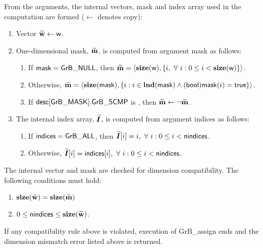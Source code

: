 From the arguments, the internal vectors, mask and index array used in 
the computation are formed ($\leftarrow$ denotes copy):
\begin{enumerate}
	\item Vector ${\bf \widetilde{w}} \leftarrow {\sf w}$.

	\item One-dimensional mask, ${\bf \widetilde{m}}$, is computed from 
    argument {\sf mask} as follows:
	\begin{enumerate}
		\item	If ${\sf mask} = {\sf GrB\_NULL}$, then ${\bf \widetilde{m}} = 
        \langle \bold{size}({\sf w}), \{i, \ \forall \ i : 0 \leq i < 
        \bold{size}({\sf w}) \} \rangle$.

		\item	Otherwise, ${\bf \widetilde{m}} = 
        \langle \bold{size}({\sf mask}), \{i : i \in \bold{ind}({\sf mask}) \wedge
        ({\sf bool}){\sf mask}(i) = {\sf true} \} \rangle$.

		\item	If ${\sf desc[GrB\_MASK].GrB\_SCMP}$ is \true, then 
        ${\bf \widetilde{m}} \leftarrow \neg {\bf \widetilde{m}}$.
	\end{enumerate}

    \item The internal index array, $\bm{\widetilde{I}}$, is computed from 
    argument {\sf indices} as follows:
	\begin{enumerate}
		\item	If ${\sf indices} = {\sf GrB\_ALL}$, then 
        $\bm{\widetilde{I}}[i] = i, \ \forall \ i : 0 \leq i < {\sf nindices}$.

		\item	Otherwise, $\bm{\widetilde{I}}[i] = {\sf indices}[i], 
        \ \forall \ i : 0 \leq i < {\sf nindices}$.
    \end{enumerate}
\end{enumerate}

The internal vector and mask are checked for dimension compatibility. 
The following conditions must hold:
\begin{enumerate}
	\item $\bold{size}({\bf \widetilde{w}}) = \bold{size}({\bf \widetilde{m}})$

    \item $0 \leq {\sf nindices} \leq \bold{size}({\bf \widetilde{w}})$. 
\end{enumerate}
If any compatibility rule above is violated, execution of {\sf GrB\_assign} ends and 
the dimension mismatch error listed above is returned.

